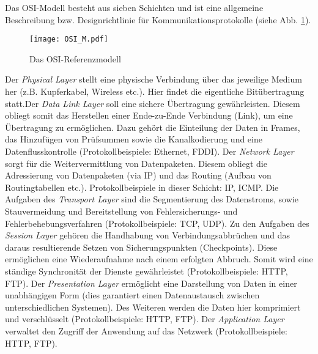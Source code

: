Das OSI-Modell besteht aus sieben Schichten und ist eine allgemeine Beschreibung
bzw. Designrichtlinie f{\"u}r Kommunikationsprotokolle (siehe Abb.
\ref{fig:OSI_M}).

\begin{figure}[H]
	\centering
	\texttt{[image: OSI\_M.pdf]}
	\caption{Das OSI-Referenzmodell}
	\label{fig:OSI_M}
\end{figure}


Der \textit{Physical Layer} stellt eine physische Verbindung {\"u}ber das
jeweilige Medium her (z.B. Kupferkabel, Wireless etc.). Hier findet die eigentliche
Bit{\"u}bertragung statt.\newline \newline Der \textit{Data Link Layer} soll
eine sichere {\"U}bertragung gew{\"a}hrleisten. Diesem obliegt somit das Herstellen
einer Ende-zu-Ende Verbindung (Link), um eine {\"U}bertragung zu
erm{\"o}glichen. Dazu geh{\"o}rt die Einteilung der Daten in Frames, das
Hinzuf{\"u}gen von Pr{\"u}fsummen sowie die Kanalkodierung und eine
Datenflusskontrolle (Protokollbeispiele: Ethernet, FDDI). \newline \newline Der
\textit{Network Layer} sorgt f{\"u}r die Weitervermittlung von Datenpaketen.
Diesem obliegt die Adressierung von Datenpaketen (via \gls{IP}) und das Routing
(Aufbau von Routingtabellen etc.). Protokollbeispiele in dieser Schicht:
\gls{IP}, ICMP. \newline \newline Die Aufgaben des \textit{Transport Layer} sind
die Segmentierung des Datenstroms, sowie Stauvermeidung und Bereitstellung von
Fehlersicherungs- und Fehlerbehebungsverfahren (Protokollbeispiele: \gls{TCP},
\gls{UDP}). \newline \newline Zu den Aufgaben des \textit{Session Layer}
geh{\"o}ren die Handhabung von Verbindungsabbr{\"u}chen und das daraus resultierende Setzen von
Sicherungspunkten (Checkpoints). Diese erm{\"o}glichen eine Wiederaufnahme
nach einem erfolgten Abbruch. Somit wird eine st{\"a}ndige Synchronit{\"a}t der
Dienste gew{\"a}hrleistet (Protokollbeispiele: HTTP, FTP). \newline \newline Der
\textit{Presentation Layer} erm{\"o}glicht eine Darstellung von Daten in einer
unabh{\"a}ngigen Form (dies garantiert einen Datenaustausch zwischen
unterschiedlichen Systemen). Des Weiteren werden die Daten hier komprimiert und
verschl{\"u}sselt (Protokollbeispiele: HTTP, FTP). \newline \newline Der
\textit{Application Layer} verwaltet den Zugriff der Anwendung auf das Netzwerk
(Protokollbeispiele: HTTP, FTP).

